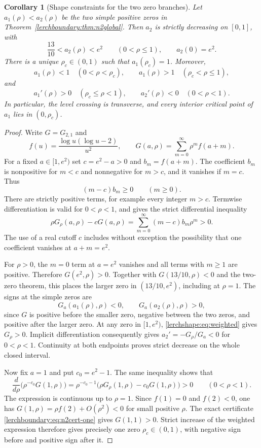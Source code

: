 \documentclass[11pt,a4paper]{article}
\newtheorem{corollary}[theorem]{Corollary}
\theoremstyle{definition}
\theoremstyle{remark}
\numberwithin{equation}{section}
\begin{document}
\begin{corollary}[Shape constraints for the two zero branches]
\label{lerchshape:cor:n2}
Let $a_1(\rho)<a_2(\rho)$ be the two simple positive zeros in
Theorem~\ref{lerchboundary:thm:n2global}. Then $a_2$ is strictly
decreasing on $[0,1]$, with
\[
 \frac{13}{10}<a_2(\rho)<e^2\qquad(0<\rho\leq1),
 \qquad a_2(0)=e^2.
\]
There is a unique $\rho_c\in(0,1)$ such that $a_1(\rho_c)=1$.
Moreover,
\[
 a_1(\rho)<1\quad(0<\rho<\rho_c),\qquad
 a_1(\rho)>1\quad(\rho_c<\rho\leq1),
\]
and
\[
 a_1'(\rho)>0\quad(\rho_c\leq\rho<1),\qquad
 a_2'(\rho)<0\quad(0<\rho<1).
\]
In particular, the level crossing is transverse, and every interior
critical point of $a_1$ lies in $(0,\rho_c)$.
\end{corollary}

\begin{proof}
Write $G=G_{2,1}$ and
\[
 f(u)=\frac{\log u(\log u-2)}{u^2},\qquad
 G(a,\rho)=\sum_{m=0}^{\infty}\rho^m f(a+m).
\]
For a fixed $a\in[1,e^2)$ set $c=e^2-a>0$ and $b_m=f(a+m)$.
The coefficient $b_m$ is nonpositive for $m<c$ and nonnegative
for $m>c$, and it vanishes if $m=c$. Thus
\[
 (m-c)b_m\geq0\qquad(m\geq0).
\]
There are strictly positive terms, for example every integer $m>c$.
Termwise differentiation is valid for $0<\rho<1$, and gives the
strict differential inequality
\begin{equation}\label{lerchshape:eq:weighted}
 \rho G_\rho(a,\rho)-cG(a,\rho)
   =\sum_{m=0}^{\infty}(m-c)b_m\rho^m>0.
\end{equation}
The use of a real cutoff $c$ includes without exception the possibility
that one coefficient vanishes at $a+m=e^2$.

For $\rho>0$, the $m=0$ term at $a=e^2$ vanishes and all terms with
$m\geq1$ are positive. Therefore $G(e^2,\rho)>0$. Together with
$G(13/10,\rho)<0$ and the two-zero theorem, this places the larger
zero in $(13/10,e^2)$, including at $\rho=1$. The signs at the
simple zeros are
\[
 G_a(a_1(\rho),\rho)<0,
 \qquad G_a(a_2(\rho),\rho)>0,
\]
since $G$ is positive before the smaller zero, negative between
the two zeros, and positive after the larger zero. At any zero
in $[1,e^2)$, \eqref{lerchshape:eq:weighted} gives $G_\rho>0$.
Implicit differentiation consequently gives $a_2'=-G_\rho/G_a<0$
for $0<\rho<1$. Continuity at both endpoints proves strict decrease
on the whole closed interval.

Now fix $a=1$ and put $c_0=e^2-1$. The same inequality shows that
\[
 \frac{d}{d\rho}\bigl(\rho^{-c_0}G(1,\rho)\bigr)
 =\rho^{-c_0-1}\bigl(\rho G_\rho(1,\rho)-c_0G(1,\rho)\bigr)>0
 \qquad(0<\rho<1).
\]
The expression is continuous up to $\rho=1$. Since $f(1)=0$ and
$f(2)<0$, one has $G(1,\rho)=\rho f(2)+O(\rho^2)<0$ for small
positive $\rho$. The exact certificate
\eqref{lerchboundary:eq:n2cert-one} gives $G(1,1)>0$.
Strict increase of the weighted expression therefore gives precisely
one zero $\rho_c\in(0,1)$, with negative sign before and positive
sign after it.


\end{proof}
\end{document}

